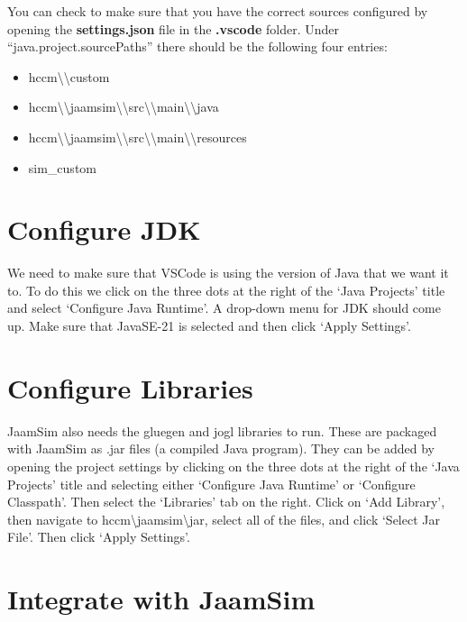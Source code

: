 \documentclass[
  10pt,
  a4paperpaper,
  DIV=11,
  numbers=noendperiod,
  oneside]{scrreprt}
\providecommand{\tightlist}{%
  \setlength{\itemsep}{0pt}\setlength{\parskip}{0pt}}\usepackage{longtable,booktabs,array}
\begin{document}
You can check to make sure that you have the correct sources configured
by opening the \textbf{settings.json} file in the \textbf{.vscode}
folder. Under ``java.project.sourcePaths'' there should be the following
four entries:

\begin{itemize}
\tightlist
\item
  hccm\textbackslash\textbackslash custom
\item
  hccm\textbackslash\textbackslash jaamsim\textbackslash\textbackslash src\textbackslash\textbackslash main\textbackslash\textbackslash java
\item
  hccm\textbackslash\textbackslash jaamsim\textbackslash\textbackslash src\textbackslash\textbackslash main\textbackslash\textbackslash resources
\item
  sim\_custom
\end{itemize}

\section{Configure JDK}\label{configure-jdk}

We need to make sure that VSCode is using the version of Java that we
want it to. To do this we click on the three dots at the right of the
`Java Projects' title and select `Configure Java Runtime'. A drop-down
menu for JDK should come up. Make sure that JavaSE-21 is selected and
then click `Apply Settings'.

\section{Configure Libraries}\label{configure-libraries}

JaamSim also needs the gluegen and jogl libraries to run. These are
packaged with JaamSim as .jar files (a compiled Java program). They can
be added by opening the project settings by clicking on the three dots
at the right of the `Java Projects' title and selecting either
`Configure Java Runtime' or `Configure Classpath'. Then select the
`Libraries' tab on the right. Click on `Add Library', then navigate to
hccm\textbackslash jaamsim\textbackslash jar, select all of the files,
and click `Select Jar File'. Then click `Apply Settings'.

\section{Integrate with JaamSim}\label{integrate-with-jaamsim}
\end{document}
